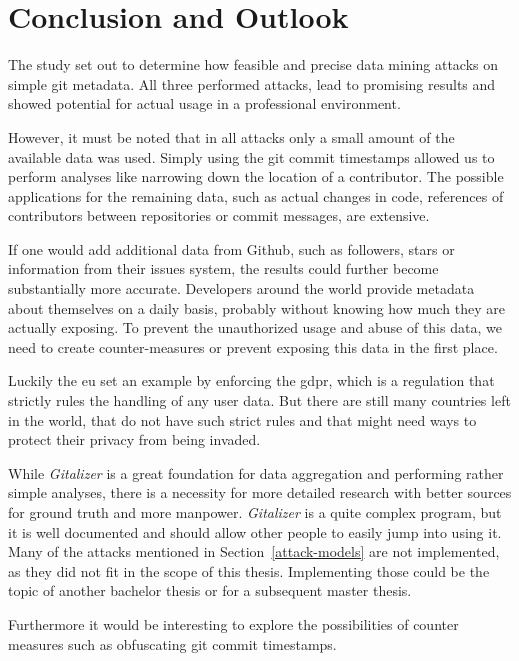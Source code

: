 \chapter{Conclusion and Outlook}

The study set out to determine how feasible and precise data mining attacks on simple git metadata.
All three performed attacks, lead to promising results and showed potential for actual usage in a professional environment.

However, it must be noted that in all attacks only a small amount of the available data was used.
Simply using the git commit timestamps allowed us to perform analyses like narrowing down the location of a contributor.
The possible applications for the remaining data, such as actual changes in code, references of contributors between repositories or commit messages, are extensive.

If one would add additional data from Github, such as followers, stars or information from their issues system, the results could further become substantially more accurate.
Developers around the world provide metadata about themselves on a daily basis, probably without knowing how much they are actually exposing.
To prevent the unauthorized usage and abuse of this data, we need to create counter-measures or prevent exposing this data in the first place.

Luckily the \ac{eu} set an example by enforcing the \ac{gdpr}, which is a regulation that strictly rules the handling of any user data.
But there are still many countries left in the world, that do not have such strict rules and that might need ways to protect their privacy from being invaded.

While \emph{Gitalizer} is a great foundation for data aggregation and performing rather simple analyses, there is a necessity for more detailed research with better sources for ground truth and more manpower.
\emph{Gitalizer} is a quite complex program, but it is well documented and should allow other people to easily jump into using it.
Many of the attacks mentioned in Section~\ref{attack-models} are not implemented, as they did not fit in the scope of this thesis.
Implementing those could be the topic of another bachelor thesis or for a subsequent master thesis.

Furthermore it would be interesting to explore the possibilities of counter measures such as obfuscating git commit timestamps.
